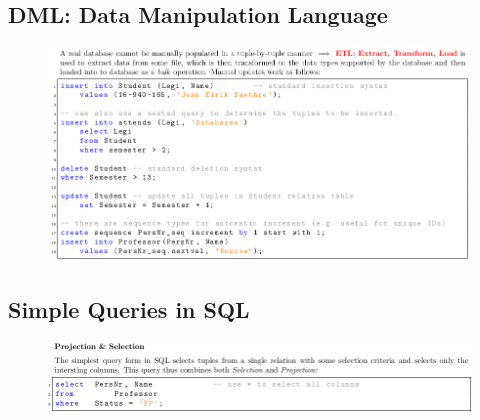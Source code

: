 \documentclass[11pt,oneside,a4paper]{article}
\begin{document}
\subsection{DML: Data Manipulation Language}
\vspace{-\topsep}
\begin{figure}[hb!]
	\centering
	\includegraphics[width=1\linewidth]{figures/sql_2}
	\label{fig:sql2}
\end{figure}
\vspace{-\topsep}

\subsection{Simple Queries in SQL}
\vspace{-\topsep}
\begin{figure}[hb!]
	\centering
	\includegraphics[width=1\linewidth]{figures/sql_3}
	\label{fig:sql3}
\end{figure}
\vspace{-\topsep}
\end{document}
